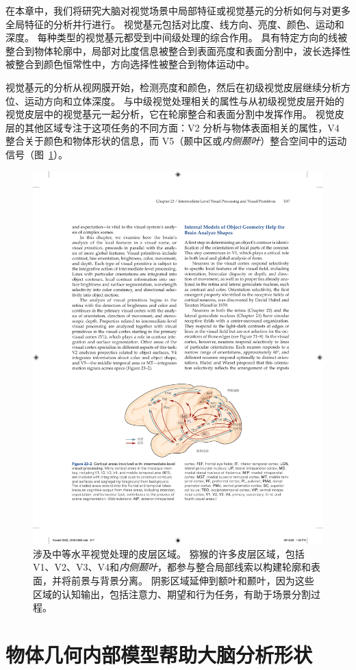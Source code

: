 在本章中，我们将研究大脑对视觉场景中局部特征或视觉基元的分析如何与对更多全局特征的分析并行进行。
视觉基元包括对比度、线方向、亮度、颜色、运动和深度。
每种类型的视觉基元都受到中间级处理的综合作用。
具有特定方向的线被整合到物体轮廓中，局部对比度信息被整合到表面亮度和表面分割中，波长选择性被整合到颜色恒常性中，方向选择性被整合到物体运动中。


视觉基元的分析从视网膜开始，检测亮度和颜色，然后在初级视觉皮层继续分析方位、运动方向和立体深度。
与中级视觉处理相关的属性与从初级视觉皮层开始的视觉皮层中的视觉基元一起分析，它在轮廓整合和表面分割中发挥作用。
视觉皮层的其他区域专注于这项任务的不同方面：V2 分析与物体表面相关的属性，V4 整合关于颜色和物体形状的信息，而 V5（颞中区或\textit{内侧颞叶}）整合空间中的运动信号（图~\ref{fig:23_2}）。


\begin{figure}[htbp]
	\centering
	\includegraphics[width=0.75\linewidth]{chap23/fig_23_2}
	\caption{涉及中等水平视觉处理的皮层区域。
		猕猴的许多皮层区域，包括V1、V2、V3、V4和\textit{内侧颞叶}，都参与整合局部线索以构建轮廓和表面，并将前景与背景分离。
		阴影区域延伸到额叶和颞叶，因为这些区域的认知输出，包括注意力、期望和行为任务，有助于场景分割过程。}
	\label{fig:23_2}
\end{figure}



\section{物体几何内部模型帮助大脑分析形状}

